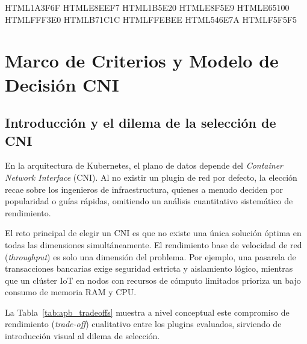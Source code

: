 
\definecolor{oe3azul}    {HTML}{1A3F6F}   %
\definecolor{oe3azulcl}  {HTML}{E8EEF7}   %
\definecolor{oe3verde}   {HTML}{1B5E20}   %
\definecolor{oe3verdecl} {HTML}{E8F5E9}
\definecolor{oe3ambar}   {HTML}{E65100}   %
\definecolor{oe3ambarcl} {HTML}{FFF3E0}
\definecolor{oe3rojo}    {HTML}{B71C1C}   %
\definecolor{oe3rojocl}  {HTML}{FFEBEE}
\definecolor{oe3gris}    {HTML}{546E7A}   %
\definecolor{oe3griscl}  {HTML}{F5F5F5}  %


\chapter{Marco de Criterios y Modelo de Decisión CNI} \label{chap:apendice_oe3}

\section{Introducción y el dilema de la selección de CNI} \label{sec:apb_intro}

En la arquitectura de Kubernetes, el plano de datos depende del \emph{Container Network Interface} (CNI). Al no existir un plugin de red por defecto, la elección recae sobre los ingenieros de infraestructura, quienes a menudo deciden por popularidad o guías rápidas, omitiendo un análisis cuantitativo sistemático de rendimiento.

El reto principal de elegir un CNI es que no existe una única solución óptima en todas las dimensiones simultáneamente. El rendimiento base de velocidad de red (\emph{throughput}) es solo una dimensión del problema. Por ejemplo, una pasarela de transacciones bancarias exige seguridad estricta y aislamiento lógico, mientras que un clúster IoT en nodos con recursos de cómputo limitados prioriza un bajo consumo de memoria RAM y CPU.

La Tabla~\ref{tab:apb_tradeoffs} muestra a nivel conceptual este compromiso de rendimiento (\emph{trade-off}) cualitativo entre los plugins evaluados, sirviendo de introducción visual al dilema de selección.

